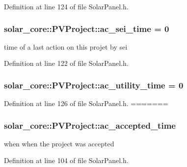 Definition at line 124 of file Solar\+Panel.\+h.

\hypertarget{classsolar__core_1_1_p_v_project_a0a78a4b527a897aac39e5572fbb5a842}{}
\subsubsection[{ac\+\_\+sei\+\_\+time}]{ solar\+\_\+core\+::\+P\+V\+Project\+::ac\+\_\+sei\+\_\+time = 0}\label{classsolar__core_1_1_p_v_project_a0a78a4b527a897aac39e5572fbb5a842}
time of a last action on this projet by sei 

Definition at line 122 of file Solar\+Panel.\+h.

\hypertarget{classsolar__core_1_1_p_v_project_a7a44008469a8db9a47038e2945a5d723}{}
\subsubsection[{ac\+\_\+utility\+\_\+time}]{ solar\+\_\+core\+::\+P\+V\+Project\+::ac\+\_\+utility\+\_\+time = 0}\label{classsolar__core_1_1_p_v_project_a7a44008469a8db9a47038e2945a5d723}


Definition at line 126 of file Solar\+Panel.\+h.
=======
\subsubsection[{ac\+\_\+accepted\+\_\+time}]{ solar\+\_\+core\+::\+P\+V\+Project\+::ac\+\_\+accepted\+\_\+time}\label{classsolar__core_1_1_p_v_project_a1affdb487e749b689fe2bcbd9c79613c}
when when the project was accepted 

Definition at line 104 of file Solar\+Panel.\+h.

\hypertarget{classsolar__core_1_1_p_v_project_a9be23309024672b4be445f68c73e42a6}{}
